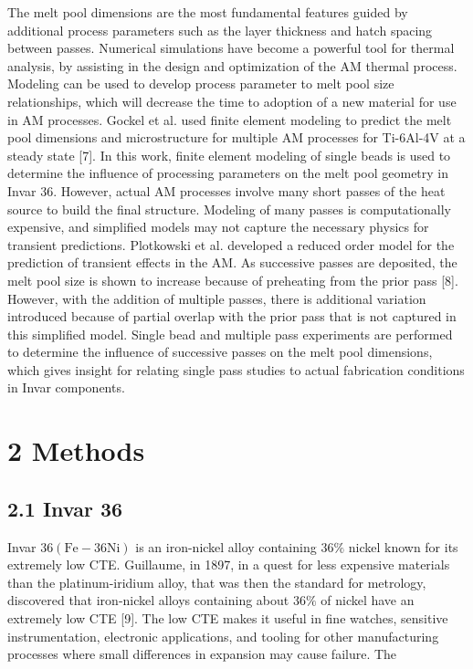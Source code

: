 \documentclass[10pt]{article}
\begin{document}
The melt pool dimensions are the most fundamental features guided by additional process parameters such as the layer thickness and hatch spacing between passes. Numerical simulations have become a powerful tool for thermal analysis, by assisting in the design and optimization of the AM thermal process. Modeling can be used to develop process parameter to melt pool size relationships, which will decrease the time to adoption of a new material for use in AM processes. Gockel et al. used finite element modeling to predict the melt pool dimensions and microstructure for multiple AM processes for Ti-6Al-4V at a steady state [7]. In this work, finite element modeling of single beads is used to determine the influence of processing parameters on the melt pool geometry in Invar 36. However, actual AM processes involve many short passes of the heat source to build the final structure. Modeling of many passes is computationally expensive, and simplified models may not capture the necessary physics for transient predictions. Plotkowski et al. developed a reduced order model for the prediction of transient effects in the AM. As successive passes are deposited, the melt pool size is shown to increase because of preheating from the prior pass [8]. However, with the addition of multiple passes, there is additional variation introduced because of partial overlap with the prior pass that is not captured in this simplified model. Single bead and multiple pass experiments are performed to determine the influence of successive passes on the melt pool dimensions, which gives insight for relating single pass studies to actual fabrication conditions in Invar components.

\section*{2 Methods}
\subsection*{2.1 Invar 36}
Invar $36(\mathrm{Fe}-36 \mathrm{Ni})$ is an iron-nickel alloy containing $36 \%$ nickel known for its extremely low CTE. Guillaume, in 1897, in a quest for less expensive materials than the platinum-iridium alloy, that was then the standard for metrology, discovered that iron-nickel alloys containing about $36 \%$ of nickel have an extremely low CTE [9]. The low CTE makes it useful in fine watches, sensitive instrumentation, electronic applications, and tooling for other manufacturing processes where small differences in expansion may cause failure. The
\end{document}
